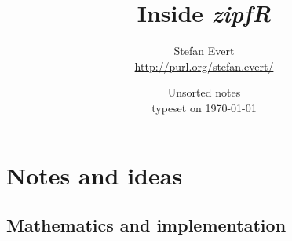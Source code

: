 \documentclass[a4paper]{article}
\title{Inside \emph{zipfR}}
\author{Stefan Evert\\ \url{http://purl.org/stefan.evert/}}
\date{Unsorted notes\\typeset on \today}
\begin{document}
\maketitle

\listoftodos
\tableofcontents

\section{Notes and ideas}
\label{sec:notes}

\subsection{Mathematics and implementation}
\label{sec:notes:math}
\end{document}
